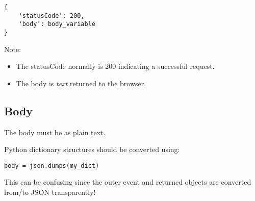 \documentclass[slides]{pgnotes}
\begin{document}
\begin{verbatim}
{
    'statusCode': 200,
    'body': body_variable
}
\end{verbatim}

Note:
\begin{itemize}
\item The statusCode normally is 200 indicating a successful request.
\item The body is \emph{text} returned to the browser.
\end{itemize}

\subsection{Body}\label{body}

The body must be as plain text.

Python dictionary structures should be converted using:

\begin{verbatim}
body = json.dumps(my_dict)
\end{verbatim}

This can be confusing since the outer event and returned objects are converted from/to JSON transparently!
\end{document}
